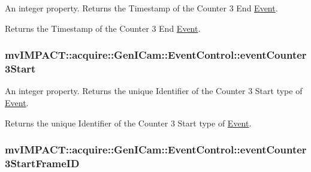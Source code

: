 An integer property. Returns the Timestamp of the Counter 3 End \hyperlink{classmv_i_m_p_a_c_t_1_1acquire_1_1_event}{Event}. 

Returns the Timestamp of the Counter 3 End \hyperlink{classmv_i_m_p_a_c_t_1_1acquire_1_1_event}{Event}. \hypertarget{classmv_i_m_p_a_c_t_1_1acquire_1_1_gen_i_cam_1_1_event_control_ae705fe6e513dc55e8cf0ffb3aec05d2d}{
\subsubsection[{event\+Counter3\+Start}]{ mv\+I\+M\+P\+A\+C\+T\+::acquire\+::\+Gen\+I\+Cam\+::\+Event\+Control\+::event\+Counter3\+Start}}\label{classmv_i_m_p_a_c_t_1_1acquire_1_1_gen_i_cam_1_1_event_control_ae705fe6e513dc55e8cf0ffb3aec05d2d}


An integer property. Returns the unique Identifier of the Counter 3 Start type of \hyperlink{classmv_i_m_p_a_c_t_1_1acquire_1_1_event}{Event}. 

Returns the unique Identifier of the Counter 3 Start type of \hyperlink{classmv_i_m_p_a_c_t_1_1acquire_1_1_event}{Event}. \hypertarget{classmv_i_m_p_a_c_t_1_1acquire_1_1_gen_i_cam_1_1_event_control_a7c29f55301013e0d522719ee768ec868}{
\subsubsection[{event\+Counter3\+Start\+Frame\+I\+D}]{ mv\+I\+M\+P\+A\+C\+T\+::acquire\+::\+Gen\+I\+Cam\+::\+Event\+Control\+::event\+Counter3\+Start\+Frame\+I\+D}}\label{classmv_i_m_p_a_c_t_1_1acquire_1_1_gen_i_cam_1_1_event_control_a7c29f55301013e0d522719ee768ec868}


